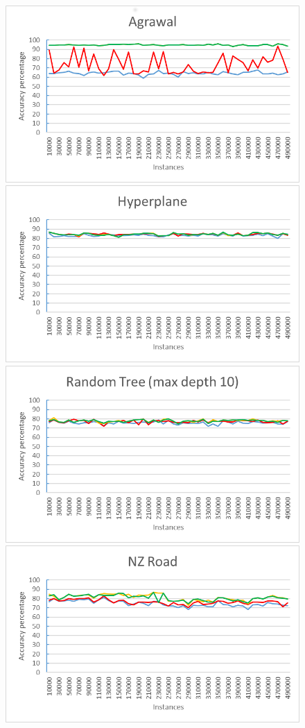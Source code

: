 \begin{figure}[h]
\begin{center}
\includegraphics[scale=0.25]{Graphs/Agrawal/graph}
\includegraphics[scale=0.25]{Graphs/Hyperplane/graph}
\includegraphics[scale=0.25]{Graphs/TreeD10/graph}
\includegraphics[scale=0.25]{Graphs/NZRoad/graph}

\end{center}
\end{figure}
